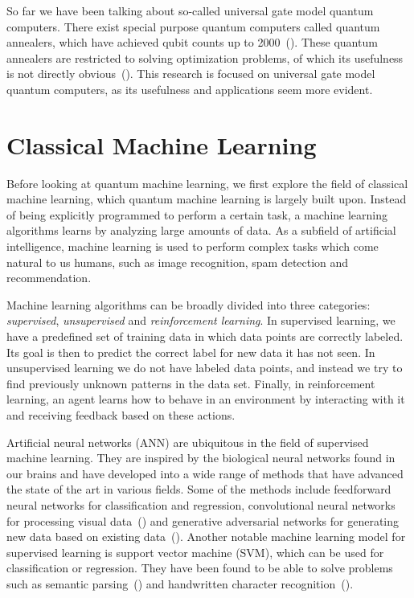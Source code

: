 \documentclass[a4paper,10pt]{article}
\begin{document}
So far we have been talking about so-called universal gate model quantum computers.
There exist special purpose quantum computers called quantum annealers, which have achieved qubit counts up to 2000~(\cite{dwave-2000}).
These quantum annealers are restricted to solving optimization problems, of which its usefulness is not directly obvious~(\cite{how-quantum-dwave, aaronson-dwave, detecting-quantum-speedup}).
This research is focused on universal gate model quantum computers, as its usefulness and applications seem more evident.

\section{Classical Machine Learning} \label{sec:classical-ml}
Before looking at quantum machine learning, we first explore the field of classical machine learning, which quantum machine learning is largely built upon.
Instead of being explicitly programmed to perform a certain task, a machine learning algorithms learns by analyzing large amounts of data.
As a subfield of artificial intelligence, machine learning is used to perform complex tasks which come natural to us humans, such as image recognition, spam detection and recommendation.

Machine learning algorithms can be broadly divided into three categories: \emph{supervised}, \emph{unsupervised} and \emph{reinforcement learning}.
In supervised learning, we have a predefined set of training data in which data points are correctly labeled.
Its goal is then to predict the correct label for new data it has not seen.
In unsupervised learning we do not have labeled data points, and instead we try to find previously unknown patterns in the data set.
Finally, in reinforcement learning, an agent learns how to behave in an environment by interacting with it and receiving feedback based on these actions.

Artificial neural networks (ANN) are ubiquitous in the field of supervised machine learning.
They are inspired by the biological neural networks found in our brains and have developed into a wide range of methods that have advanced the state of the art in various fields.
Some of the methods include feedforward neural networks for classification and regression, convolutional neural networks for processing visual data~(\cite{cirecsan2012multi}) and generative adversarial networks for generating new data based on existing data~(\cite{goodfellow2014generative}).
Another notable machine learning model for supervised learning is support vector machine (SVM), which can be used for classification or regression.
They have been found to be able to solve problems such as semantic parsing~(\cite{pradhan2004shallow}) and handwritten character recognition~(\cite{decoste2002training}).
\end{document}

